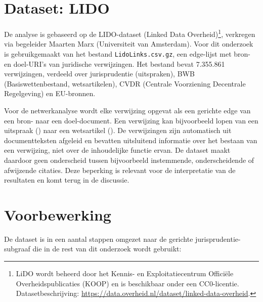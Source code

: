 \documentclass[a4paper, 12pt]{report}
\begin{document}
\section{Dataset: LIDO}

De analyse is gebaseerd op de LIDO-dataset (Linked Data Overheid)\footnote{LiDO wordt beheerd door het Kennis- en Exploitatiecentrum Officiële Overheidspublicaties (KOOP) en is beschikbaar onder een CC0-licentie. Datasetbeschrijving: \url{https://data.overheid.nl/dataset/linked-data-overheid}.}, verkregen via begeleider Maarten Marx (Universiteit van Amsterdam). Voor dit onderzoek is gebruikgemaakt van het bestand \texttt{LidoLinks.csv.gz}, een edge-lijst met bron- en doel-URI's van juridische verwijzingen. Het bestand bevat 7.355.861 verwijzingen, verdeeld over jurisprudentie (uitspraken), BWB (Basiswettenbestand, wetsartikelen), CVDR (Centrale Voorziening Decentrale Regelgeving) en EU-bronnen.


Voor de netwerkanalyse wordt elke verwijzing opgevat als een gerichte edge van een bron- naar een doel-document. Een verwijzing kan bijvoorbeeld lopen van een uitspraak () naar een wetsartikel (). De verwijzingen zijn automatisch uit documentteksten afgeleid en bevatten uitsluitend informatie over het bestaan van een verwijzing, niet over de inhoudelijke functie ervan. De dataset maakt daardoor geen onderscheid tussen bijvoorbeeld instemmende, onderscheidende of afwijzende citaties. Deze beperking is relevant voor de interpretatie van de resultaten en komt terug in de discussie.


\section{Voorbewerking}

De dataset is in een aantal stappen omgezet naar de gerichte jurisprudentie-subgraaf die in de rest van dit onderzoek wordt gebruikt:
\end{document}

